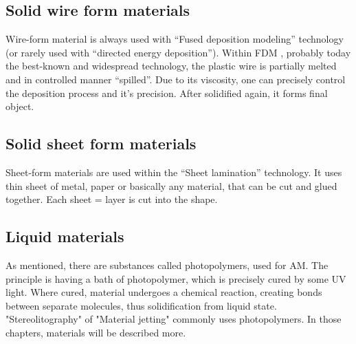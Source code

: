 \documentclass[a4paper]{report}
\begin{document}
\subsection{Solid wire form materials}
Wire-form material is always used with “Fused deposition modeling” technology (or rarely used with “directed energy deposition”). Within FDM , probably today the best-known and widespread technology, the plastic wire is partially melted and in controlled manner “spilled”. Due to its viscosity, one can precisely control the deposition process and it’s precision. After solidified again, it forms final object.
\subsection{Solid sheet form materials}
Sheet-form materials are used within the “Sheet lamination” technology. It uses thin sheet of metal, paper or basically any material, that can be cut and glued together. Each sheet = layer is cut into the shape.
\subsection{Liquid materials}
As mentioned, there are substances called photopolymers, used for AM. The principle is having a bath of photopolymer, which is precisely cured by some UV light. Where cured, material undergoes a chemical reaction, creating bonds between separate molecules, thus solidification from liquid state. "Stereolitography" of "Material jetting" commonly uses photopolymers. In those chapters, materials will be described more.\\
\end{document}
